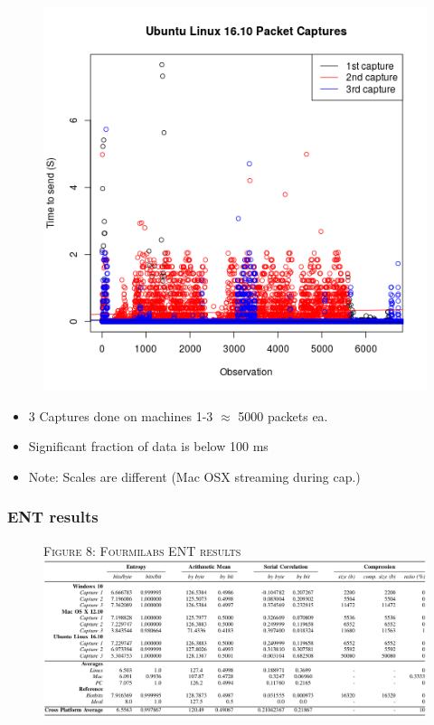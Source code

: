 \documentclass{beamer}
\begin{document}
\begin{frame}
\begin{figure}
\includegraphics[scale = 0.22]{images/Micah2.png}
\end{figure}


\begin{itemize}
	\item 3 Captures done on machines 1-3  $\approx$ 5000 packets ea.
	\item Significant fraction of data is below 100 ms
	\item Note: Scales are different (Mac OSX streaming during cap.)
\end{itemize}

\end{frame}

\begin{frame}
\frametitle{ENT results}
\begin{figure}
{\tiny \textsc{Figure 8: Fourmilabs ENT results}}\\
\includegraphics[scale = 0.33]{images/pet.png}
\end{figure}
\end{frame}
\end{document}
